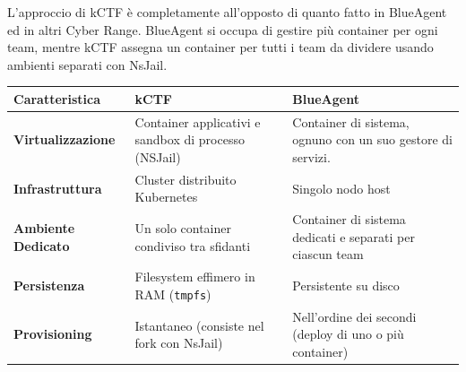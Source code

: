 L'approccio di kCTF è completamente all'opposto di quanto fatto in
BlueAgent ed in altri Cyber Range. BlueAgent si occupa di gestire più
container per ogni team, mentre kCTF assegna un container per tutti i
team da dividere usando ambienti separati con NsJail.

\begin{longtable}[]{@{}
  >{\raggedright\arraybackslash}p{}
  >{\raggedright\arraybackslash}p{}
  >{\raggedright\arraybackslash}p{}@{}}
\toprule\noalign{}
\begin{minipage}[b]{\linewidth}\raggedright
Caratteristica
\end{minipage} & \begin{minipage}[b]{\linewidth}\raggedright
kCTF
\end{minipage} & \begin{minipage}[b]{\linewidth}\raggedright
BlueAgent
\end{minipage} \\
\midrule\noalign{}
\endhead
\bottomrule\noalign{}
\endlastfoot
\textbf{Virtualizzazione} & Container applicativi e sandbox di processo
(NSJail) & Container di sistema, ognuno con un suo gestore di
servizi. \\
\textbf{Infrastruttura} & Cluster distribuito Kubernetes & Singolo nodo
host \\
\textbf{Ambiente Dedicato} & Un solo container condiviso tra sfidanti &
Container di sistema dedicati e separati per ciascun team \\
\textbf{Persistenza} & Filesystem effimero in RAM
(\passthrough{\lstinline!tmpfs!}) & Persistente su disco \\
\textbf{Provisioning} & Istantaneo (consiste nel fork con NsJail) &
Nell'ordine dei secondi (deploy di uno o più container) \\
\end{longtable}
